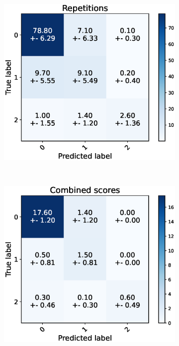 
\begin{figure}[h]
  \centering
  \begin{subfigure}[t]{0.48\textwidth}
      \includegraphics[width=\textwidth]{files/figs/res/kmfp/cnf-reps.eps}
      \caption{}
      \label{fig:kmfp-cnf-reps}
  \end{subfigure}
  ~
  \begin{subfigure}[t]{0.48\textwidth}
      \includegraphics[width=\textwidth]{files/figs/res/kmfp/cnf-combined.eps}
      \caption{}
      \label{fig:kmfp-cnf-comb}
  \end{subfigure}


\end{figure}
